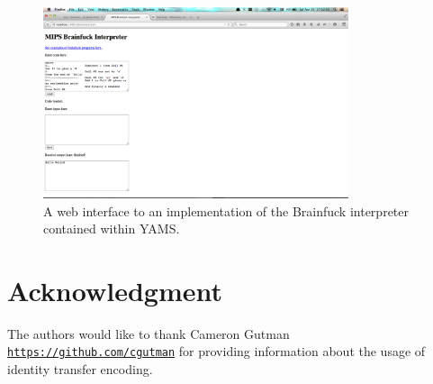 \documentclass[journal,10pt]{IEEEtran}
\begin{document}
\begin{figure}[H]
\centering
\includegraphics[width=0.8\textwidth,natwidth=1440,natheight=900]{interactive_ajax}
\caption{A web interface to an implementation of the Brainfuck interpreter contained within YAMS.}
\label{fig:interactive_ajax}
\end{figure}

\twocolumn

\section*{Acknowledgment}


The authors would like to thank Cameron Gutman
\texttt{\url{https://github.com/cgutman}} for providing information about the
usage of identity transfer encoding.


\ifCLASSOPTIONcaptionsoff
  \newpage
\fi




\nocite{*}



\end{document}
